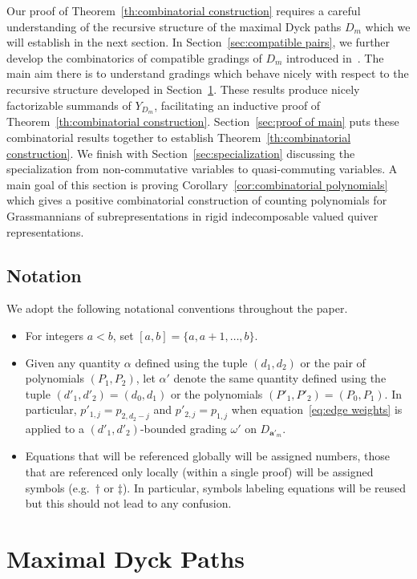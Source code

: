 \documentclass[ALCO,ThmDefs,Unicode,epreuves]{cedram}
\newcommand{\bfa}{\mathbf{a}}
\begin{document}
 Our proof of Theorem~\ref{th:combinatorial construction} requires a careful understanding of the recursive structure of the maximal Dyck paths $D_m$ which we will establish in the next section. 
 In Section~\ref{sec:compatible pairs}, we further develop the combinatorics of compatible gradings of $D_m$ introduced in~\cite{rupel2}. 
 The main aim there is to understand gradings which behave nicely with respect to the recursive structure developed in Section~\ref{sec:dyck paths}.
 These results produce nicely factorizable summands of $Y_{D_m}$, facilitating an inductive proof of Theorem~\ref{th:combinatorial construction}. 
 Section~\ref{sec:proof of main} puts these combinatorial results together to establish Theorem~\ref{th:combinatorial construction}.
 We finish with Section~\ref{sec:specialization} discussing the specialization from non-commutative variables to quasi-commuting variables.
 A main goal of this section is proving Corollary~\ref{cor:combinatorial polynomials} which gives a positive combinatorial construction of counting polynomials for Grassmannians of subrepresentations in rigid indecomposable valued quiver representations.

 \subsection*{Notation}
 We adopt the following notational conventions throughout the paper.
 \begin{itemize}
 \item For integers $a<b$, set $[a,b]=\{a,a+1,\ldots,b\}$.
 \item Given any quantity $\alpha$ defined using the tuple $(d_1,d_2)$ or the pair of polynomials $(P_1,P_2)$, let $\alpha'$ denote the same quantity defined using the tuple $(d'_1,d'_2)=(d_0,d_1)$ or the polynomials $(P'_1,P'_2)=(P_0,P_1)$. 
 In particular, $p'_{1,j}=p_{2,d_2-j}$ and $p'_{2,j}=p_{1,j}$ when equation~\eqref{eq:edge weights} is applied to a $(d'_1,d'_2)$-bounded grading $\omega'$ on $D_{\bfa'_m}$.
 \item Equations that will be referenced globally will be assigned numbers, those that are referenced only locally (\ie within a single proof) will be assigned symbols (e.g.\ $\dagger$ or $\ddagger$). 
 In particular, symbols labeling equations will be reused but this should not lead to any confusion. 
 \end{itemize}


\section{Maximal Dyck Paths}
\label{sec:dyck paths}
\end{document}
